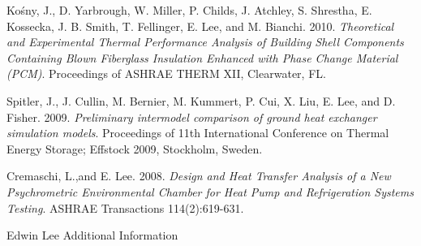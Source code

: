 \documentclass{res} %
\newcommand{\helv}[1]{{\fontfamily{phv}\selectfont #1}}
\begin{document}
\begin{resume}
{\begin{spacing}{1.1}
Kośny, J., D. Yarbrough, W. Miller, P. Childs, J. Atchley, S. Shrestha, E. Kossecka, J. B. Smith, T. Fellinger, E. Lee, and M. Bianchi. 2010. \textit{Theoretical and Experimental Thermal Performance Analysis of Building Shell Components Containing Blown Fiberglass Insulation Enhanced with Phase Change Material (PCM)}. Proceedings of ASHRAE THERM XII, Clearwater, FL. 

Spitler, J., J. Cullin, M. Bernier, M. Kummert, P. Cui, X. Liu, E. Lee, and D. Fisher. 2009. \textit{Preliminary intermodel comparison of ground heat exchanger simulation models}. Proceedings of 11th International Conference on Thermal Energy Storage; Effstock 2009, Stockholm, Sweden.

Cremaschi, L.,and E. Lee. 2008. \textit{Design and Heat Transfer Analysis of a New Psychrometric Environmental Chamber for Heat Pump and Refrigeration Systems Testing}. ASHRAE Transactions 114(2):619-631.
\end{spacing}
}

%

\clearpage

{\Huge {Edwin Lee}} \hfill {Additional Information }
\vspace{-0.25in}

\hrulefill


\end{resume}
\end{document}

